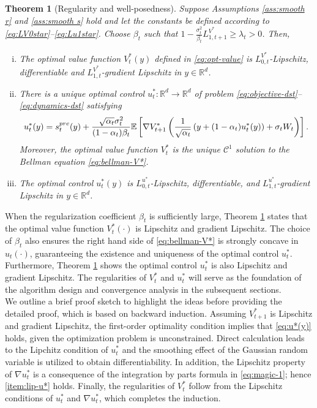 \documentclass[10pt,a4paper]{amsart}
\newtheorem{Theorem}{Theorem}[section]
\newcommand{\R}{\mathbb{R}}
\newcommand{\bracket}[1]{\left[ #1 \right]}
\newcommand{\parenthesis}[1]{\left( #1 \right)}
\newcommand{\mcal}[1]{\mathcal{#1}}
\newcommand{\E}{\mathbb{E}}
\begin{document}
\begin{Theorem}[Regularity and well-posedness]\label{thm:well-posed}
Suppose Assumptions \ref{ass:smooth r} and \ref{ass:smooth s} hold and let the constants be defined according to \eqref{eq:LV0star}--\eqref{eq:Lu1star}. Choose $\beta_t$ such that $ 1 - \frac{\sigma_t^2}{\beta_t}L_{1, t+1}^{V^*} \geq \lambda_{t} > 0  $. Then,
\begin{enumerate}[(i)]
\item The optimal value function $V_t^*(y)$ defined in \eqref{eq:opt-value} is $L_{0,t}^{V^{*}}$-Lipschitz, differentiable and $L_{1,t}^{V^{*}}$-gradient Lipschitz in $y \in \R^d$.

    \item There is a unique optimal control $u_t^*: \R^d \to \R^d$ of problem \eqref{eq:objective-dst}--\eqref{eq:dynamics-dst} satisfying
\begin{eqnarray}\label{eq:u*(y)}
     u_{t}^{*}(y)  = s_{t}^{\rm pre}(y) + \frac{\sqrt{\alpha_{t}}\sigma_{t}^{2}}{(1 - \alpha_{t})\beta_t}\E\bracket{\nabla V_{t+1}^{*}\left(\frac{1}{\sqrt{\alpha_t}}\parenthesis{y + (1 - \alpha_t)u_t^*(y)} + \sigma_t W_t\right)}.
\end{eqnarray}
Moreover, the optimal value function $V_t^*$ is the unique $\mcal{C}^1$ solution to the Bellman equation \eqref{eq:bellman-V*}. 
\item \label{item:lip-u*} The optimal control $u_t^*(y)$ is $L_{0, t}^{u^{*}}$-Lipschitz, differentiable, and $ L_{1,t}^{u^{*}} $-gradient Lipschitz in $y \in \R^d$.

\end{enumerate}
\end{Theorem}


When the regularization coefficient $\beta_t$ is sufficiently large, Theorem \ref{thm:well-posed} states that the optimal value function $V_t^*(\cdot)$ is Lipschitz and gradient Lipschitz. The choice of $\beta_t$ also ensures the right hand side of \eqref{eq:bellman-V*} is strongly concave in $u_t(\cdot)$, guaranteeing the existence and uniqueness of the optimal control $u_t^*$. Furthermore, Theorem \ref{thm:well-posed} shows the optimal control $u_t^*$ is also Lipschitz and gradient Lipschitz. The regularities of $V_t^*$ and $u_t^*$ will serve as the foundation of the algorithm design and convergence analysis in the subsequent sections. \\

{We outline a brief proof sketch to highlight the ideas before providing the detailed proof, which is based on backward induction. Assuming $V_{t+1}^*$ is Lipschitz and gradient Lipschitz, the first-order optimality condition  implies that \eqref{eq:u*(y)} holds, given the  optimization problem is unconstrained. Direct calculation leads to the Lipchitz condition of $u_t^*$ and the smoothing effect of the Gaussian random variable is utilized to obtain differentiability. In addition, the Lipschitz property of $\nabla u_t^*$ is a consequence of the integration by parts formula in \eqref{eq:magic-1}; hence \eqref{item:lip-u*} holds. Finally, the regularities of $V_t^*$ follow from the Lipschitz conditions of $u_t^*$ and $\nabla u_t^*$, which completes the induction.}
\end{document}
